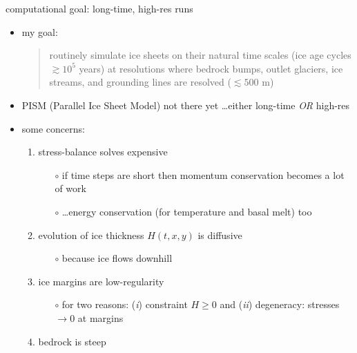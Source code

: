 \documentclass[hide notes,intlimits,usenames,dvipsnames]{beamer}
\begin{document}
\begin{frame}{computational goal: long-time, high-res runs}

\begin{itemize}
\item my goal:
\begin{quote}
routinely simulate ice sheets on their natural time scales (ice age cycles \alert{$\gtrsim 10^5$ years}) at resolutions where bedrock bumps, outlet glaciers, ice streams, and grounding lines are resolved (\alert{$\lesssim 500$ m})
\end{quote}

\medskip
\scriptsize
\item PISM (Parallel Ice Sheet Model) not there yet \dots either long-time \emph{OR} high-res

\medskip
\normalsize
\item some concerns:
    \begin{enumerate}
    \item stress-balance solves expensive
        \begin{itemize}
        \item[$\circ$] if time steps are short then momentum conservation becomes a lot of work
        \item[$\circ$] \dots energy conservation (for temperature and basal melt) too
        \end{itemize}
    \item evolution of ice thickness $H(t,x,y)$ is diffusive
        \begin{itemize}
        \item[$\circ$] because ice flows downhill
        \end{itemize}
    \item ice margins are low-regularity
        \begin{itemize}
        \item[$\circ$] for two reasons: (\emph{i}) constraint $H\ge 0$ and (\emph{ii}) degeneracy: stresses $\to 0$ at margins
        \end{itemize}
    \item bedrock is steep
    \end{enumerate}
\end{itemize}
\end{frame}
\end{document}
